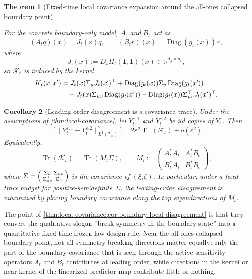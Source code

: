 \documentclass[11pt]{article}
\newtheorem{theorem}{Theorem}[section]
\newtheorem{corollary}[theorem]{Corollary}
\theoremstyle{definition}
\newcommand{\R}{\mathbb{R}}
\newcommand{\E}{\mathbb{E}}
\begin{document}
\begin{theorem}[Fixed-time local covariance expansion around the all-ones collapsed boundary point]
\begin{enumerate}[label=(\roman*),leftmargin=2em]
\end{enumerate}
For the concrete boundary-only model, $A_t$ and $B_t$ act as
\[
  (A_t q)(x)=J_t(x)q,
  \qquad
  (B_t r)(x)=\operatorname{Diag}(g_t(x))\,r,
\]
where
\[
  J_t(x):=D_u H_t(\mathbf 1,\mathbf 1)(x)\in\R^{d_y\times d_x},
\]
so $\mathcal K_t$ is induced by the kernel
\begin{align}
  K_t(x,x')
  &=
  J_t(x)\Sigma_u J_t(x')^\top
  +
  \operatorname{Diag}(g_t(x))\Sigma_v\operatorname{Diag}(g_t(x'))
  \notag\\
  &\quad
  +
  J_t(x)\Sigma_{uv}\operatorname{Diag}(g_t(x'))
  +
  \operatorname{Diag}(g_t(x))\Sigma_{uv}^\top J_t(x')^\top.
  \label{eq:local-cov-kernel}
\end{align}
\end{theorem}

\begin{corollary}[Leading-order disagreement is a covariance-trace]
\label{cor:boundary-local-disagreement}
Under the assumptions of \cref{thm:local-covariance}, let
$Y_t^{\varepsilon,1}$ and $Y_t^{\varepsilon,2}$ be iid copies of
$Y_t^\varepsilon$. Then
\begin{equation}
  \E\bigl[
    \|Y_t^{\varepsilon,1}-Y_t^{\varepsilon,2}\|_{L^2(\mathsf P_X)}^2
  \bigr]
  =
  2\varepsilon^2\operatorname{Tr}(\mathcal K_t)+o(\varepsilon^2).
  \label{eq:local-disagreement-trace}
\end{equation}
Equivalently,
\begin{equation}
  \operatorname{Tr}(\mathcal K_t)
  =
  \operatorname{Tr}(M_t\Sigma),
  \qquad
  M_t
  :=
  \begin{pmatrix}
    A_t^*A_t & A_t^*B_t\\
    B_t^*A_t & B_t^*B_t
  \end{pmatrix},
  \label{eq:local-design-matrix}
\end{equation}
where
\(
  \Sigma=
  \begin{psmallmatrix}
    \Sigma_u & \Sigma_{uv}\\
    \Sigma_{uv}^\top & \Sigma_v
  \end{psmallmatrix}
\)
is the covariance of $(\xi,\zeta)$. In particular, under a fixed trace budget
for positive-semidefinite $\Sigma$, the leading-order disagreement is maximized
by placing boundary covariance along the top eigendirections of $M_t$.
\end{corollary}

The point of \cref{thm:local-covariance,cor:boundary-local-disagreement} is that
they convert the qualitative slogan ``break symmetry in the boundary state''
into a quantitative fixed-time frozen-law design rule. Near the all-ones
collapsed boundary point, not all symmetry-breaking directions matter equally:
only the part of the boundary covariance that is seen through the active
sensitivity operators $A_t$ and $B_t$ contributes at leading order, while
directions in the kernel or near-kernel of the linearized predictor map
contribute little or nothing.
\end{document}
